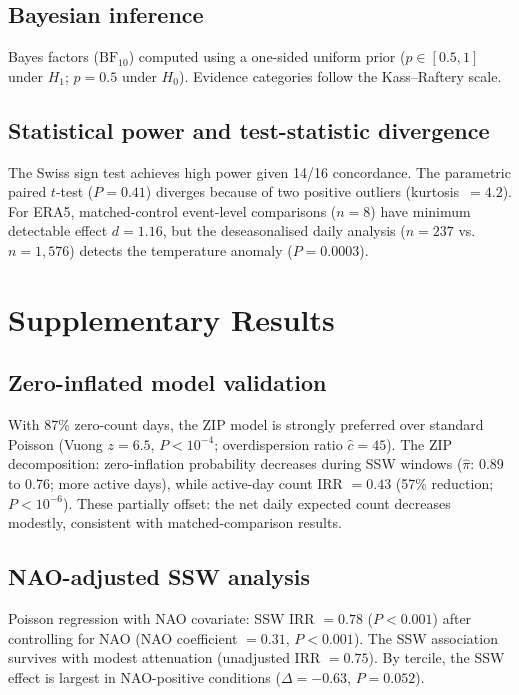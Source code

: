 \documentclass[11pt,a4paper]{article}
\begin{document}
\subsection{Bayesian inference}

Bayes factors ($\mathrm{BF}_{10}$) computed using a one-sided uniform prior ($p \in [0.5, 1]$ under $H_1$; $p = 0.5$ under $H_0$). Evidence categories follow the Kass--Raftery scale.

\subsection{Statistical power and test-statistic divergence}

The Swiss sign test achieves high power given 14/16 concordance. The parametric paired $t$-test ($P = 0.41$) diverges because of two positive outliers (kurtosis~$= 4.2$). For ERA5, matched-control event-level comparisons ($n = 8$) have minimum detectable effect $d = 1.16$, but the deseasonalised daily analysis ($n = 237$ vs.\ $n = 1{,}576$) detects the temperature anomaly ($P = 0.0003$).

\section{Supplementary Results}

\subsection{Zero-inflated model validation}

With 87\% zero-count days, the ZIP model is strongly preferred over standard Poisson (Vuong $z = 6.5$, $P < 10^{-4}$; overdispersion ratio $\hat{c} = 45$). The ZIP decomposition: zero-inflation probability decreases during SSW windows ($\hat{\pi}$: 0.89 to 0.76; more active days), while active-day count IRR $= 0.43$ (57\% reduction; $P < 10^{-6}$). These partially offset: the net daily expected count decreases modestly, consistent with matched-comparison results.

\subsection{NAO-adjusted SSW analysis}

Poisson regression with NAO covariate: SSW IRR $= 0.78$ ($P < 0.001$) after controlling for NAO (NAO coefficient $= 0.31$, $P < 0.001$). The SSW association survives with modest attenuation (unadjusted IRR $= 0.75$). By tercile, the SSW effect is largest in NAO-positive conditions ($\Delta = -0.63$, $P = 0.052$).
\end{document}

